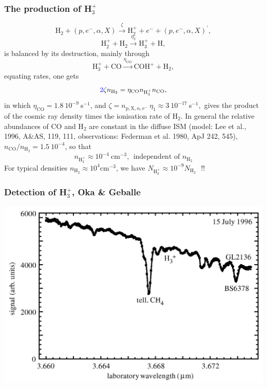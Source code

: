 \begin{frame}\frametitle{The production of  H$_3^+$}

 
\[ \mathrm{H}_2 + (p,e^-,\alpha,X) \stackrel{\zeta}{\rightarrow}
\mathrm{H}_2^+ + e^- +  (p,e^-,\alpha,X)^\prime, \]
\[\mathrm{H}_2^+ +   \mathrm{H}_2 \stackrel{\eta_2} {\rightarrow} \mathrm{H}_3^+ + \mathrm{H},\]
is balanced by its destruction, mainly through
\[ \mathrm{H}_3^+ + \mathrm{CO} \stackrel{\eta_\mathrm{CO}}{ \rightarrow} \mathrm{COH^+} +
\mathrm{H}_2, \]
equating rates, one gets
\[ \textcolor{blue}{2} \zeta n_\mathrm{H_2} = \eta_\mathrm{CO} n_\mathrm{H_3^+}
n_\mathrm{CO} ,\] in which $\eta_\mathrm{CO} = 1.8~10^{-9}~$s$^{-1}$,
and $\zeta = n_\mathrm{p,X,\alpha,e^{-}} ~\eta_1 \approx
3~10^{-17}~$s$^{-1},$ gives the product of the cosmic ray density
times the ionisation rate of H$_2$. In general the relative abundances
of CO and H$_2$ are constant in the diffuse ISM (model: Lee et al.,
1996, A\&AS, 119, 111, observations: Federman et al. 1980, ApJ 242,
545), $n_\mathrm{CO}/n_\mathrm{H_2} = 1.5~10^{-4}$, so that
\[ \boxed{ n_\mathrm{H_3^+}  \approx 10^{-4}~\mathrm{cm^{-3}}, ~~\text{independent of $n_\mathrm{H_2}$}} \]
For typical densities  $n_\mathrm{H_2} \approx 10^{4}
\mathrm{cm^{-3}}$, we have $N_{\mathrm{H}_3^+} \approx 10^{-9} N_{\mathrm{H}_2}~~~ \text{!!}$





\end{frame} \begin{frame}\frametitle{Detection of H$_3^+$, Oka \& Geballe }
\begin{center}
  \includegraphics[width=\textwidth,height=!]{./B/h3_rawspec.jpg}
\end{center}


\end{frame}

